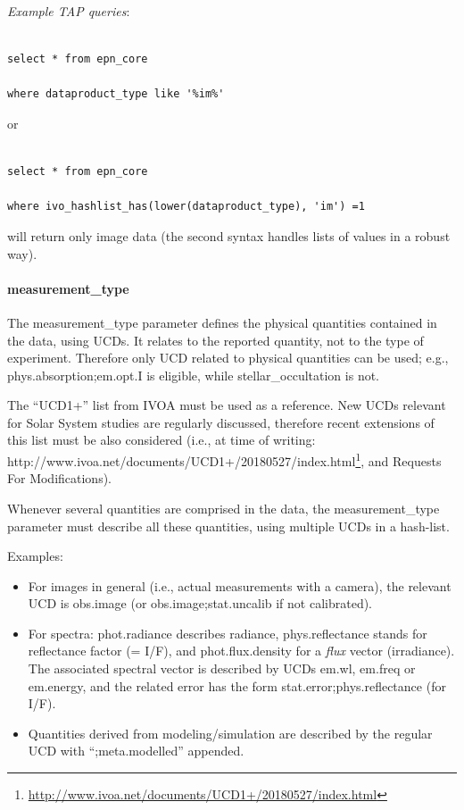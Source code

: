 \documentclass[11pt,a4paper]{ivoa}
\begin{document}
\emph{Example TAP queries}:

\begin{verbatim}

select * from epn_core 

where dataproduct_type like '%im%'

\end{verbatim}

or 

\begin{verbatim}

select * from epn_core 

where ivo_hashlist_has(lower(dataproduct_type), 'im') =1

\end{verbatim}

will return only image data (the second syntax handles lists of values in a robust way).

\paragraph{measurement\_type}

The measurement\_type parameter defines the physical quantities contained in the data, using UCDs. It relates to the reported quantity, not to the type of experiment. Therefore only UCD related to physical quantities can be used; e.g., phys.absorption;em.opt.I is eligible, while stellar\_occultation is not.

The ``UCD1+'' list from IVOA must be used as a reference. New UCDs relevant for Solar System studies are regularly discussed, therefore recent extensions of this list must be also considered (i.e., at time of writing: http://www.ivoa.net/documents/UCD1+/20180527/index.html\footnote{\url{http://www.ivoa.net/documents/UCD1+/20180527/index.html}}, and Requests For Modifications). 

Whenever several quantities are comprised in the data, the measurement\_type parameter must describe all these quantities, using multiple UCDs in a hash-list. 

Examples:

\begin{itemize}

\item For images in general (i.e., actual measurements with a camera), the relevant UCD is obs.image (or obs.image;stat.uncalib if not calibrated).

\item For spectra: phot.radiance describes radiance, phys.reflectance stands for reflectance factor (= I/F), and phot.flux.density for a \emph{flux} vector (irradiance). The associated spectral vector is described by UCDs em.wl, em.freq or em.energy, and the related error has the form stat.error;phys.reflectance (for I/F).

\item Quantities derived from modeling/simulation are described by the regular UCD with ``;meta.modelled'' appended. 

\end{itemize}
\end{document}
